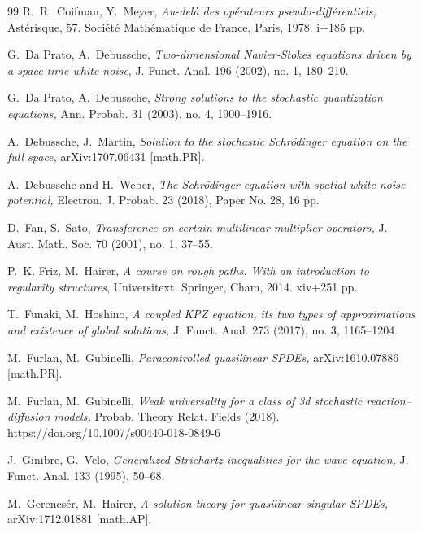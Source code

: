 \documentclass[%
11pt,  reqno]{amsart}
\newcommand{\1}{\hspace{0.2mm}\text{I}\hspace{0.2mm}}
\numberwithin{equation}{section}
\numberwithin{theorem}{section}
\begin{document}
\begin{thebibliography}{99}
R.~R.~Coifman,  Y.~Meyer,
{\it Au-del\`a des op\'erateurs pseudo-diff\'erentiels,} Ast\'erisque, 
 57. Soci\'et\'e Math\'ematique de France, Paris, 1978. i+185 pp. 
 



G.~Da Prato, A.~Debussche, 
{\it Two-dimensional Navier-Stokes equations driven by a space-time white noise}, 
J. Funct. Anal. 196 (2002), no. 1, 180--210.

G.~Da Prato, A.~Debussche, 
{\it Strong solutions to the stochastic quantization equations,} Ann. Probab. 31 (2003), no. 4, 1900--1916.


A.~Debussche,  J.~Martin,
{\it Solution to the stochastic {S}chr\"odinger equation on
  the full space,}
arXiv:1707.06431 [math.PR].

A.~Debussche and H.~Weber,
{\it The {Schr\"odinger} equation with spatial white noise potential,}
 Electron. J. Probab. 23 (2018), Paper No. 28, 16 pp.


D.~Fan, S.~Sato, {\it Transference on certain multilinear multiplier operators,}
 J. Aust. Math. Soc. 70 (2001), no. 1, 37--55.

P.~K. Friz,  M.~Hairer,
{\it A course on rough paths.
With an introduction to regularity structures}, Universitext. Springer, Cham, 2014. xiv+251 pp.

T.~Funaki,  M.~Hoshino, {\it
A coupled KPZ equation, its two types of approximations and existence of global solutions,}
 J. Funct. Anal. 273 (2017), no. 3, 1165--1204. 


M.~Furlan,  M.~Gubinelli,
{\it Paracontrolled quasilinear {SPDEs},}
arXiv:1610.07886 [math.PR].


M.~Furlan,  M.~Gubinelli,
{\it Weak universality for a class of 3d stochastic reaction--diffusion
  models,}
 Probab. Theory Relat. Fields (2018). https://doi.org/10.1007/s00440-018-0849-6




J.~Ginibre, G.~Velo, 
{\it Generalized Strichartz inequalities for the wave equation,} J. Funct. Anal. 133 (1995),
50--68.




M.~Gerencs\'er, M.~Hairer,
{\it  A solution theory for quasilinear singular {SPDEs},}
arXiv:1712.01881 [math.AP].



\end{thebibliography}
\end{document}
